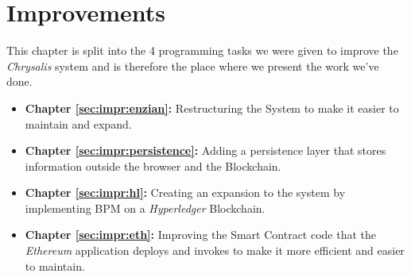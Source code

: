 %
\chapter{Improvements}
\label{sec:impr}

This chapter is split into the 4 programming tasks we were given to improve the \emph{Chrysalis} system and is therefore the place where we present the work we've done.
\begin{itemize}
    \item \textbf{Chapter \ref{sec:impr:enzian}:} Restructuring the System to make it easier to maintain and expand.
    \item \textbf{Chapter \ref{sec:impr:persistence}:} Adding a persistence layer that stores information outside the browser and the Blockchain.
    \item \textbf{Chapter \ref{sec:impr:hl}:} Creating an expansion to the system by implementing BPM on a \emph{Hyperledger} Blockchain.
    \item \textbf{Chapter \ref{sec:impr:eth}:} Improving the Smart Contract code that the \emph{Ethereum} application deploys and invokes to make it more efficient and easier to maintain.
\end{itemize}
